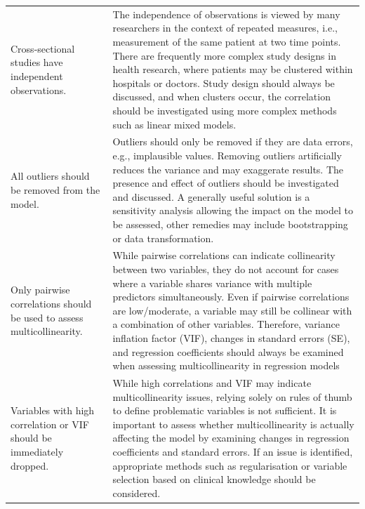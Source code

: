\begin{table}[H]
\begin{widestuff}
\begin{tabular}{p{5cm}p{13cm}}
  Cross-sectional studies have independent observations. & The independence of observations is viewed by many researchers in the context of repeated measures, i.e., measurement of the same patient at two time points.  There are frequently more complex study designs in health research, where patients may be clustered within hospitals or doctors.  Study design should always be discussed, and when clusters occur, the correlation should be investigated using more complex methods such as linear mixed models. \\ 
  All outliers should be removed from the model. & Outliers should only be removed if they are data errors, e.g., implausible values. Removing outliers artificially reduces the variance and may exaggerate results. The presence and effect of outliers should be investigated and discussed. A generally useful solution is a sensitivity analysis allowing the impact on the model to be assessed, other remedies may include bootstrapping or data transformation. \\ 
  Only pairwise correlations should be used to assess multicollinearity. & While pairwise correlations can indicate collinearity between two variables, they do not account for cases where a variable shares variance with multiple predictors simultaneously. Even if pairwise correlations are low/moderate, a variable may still be collinear with a combination of other variables. Therefore, variance inflation factor (VIF), changes in standard errors (SE), and regression coefficients should always be examined when assessing multicollinearity in regression models \\ 
  Variables with high correlation or VIF should be immediately dropped. & While high correlations and VIF may indicate multicollinearity issues, relying solely on rules of thumb to define problematic variables is not sufficient. It is important to assess whether multicollinearity is actually affecting the model by examining changes in regression coefficients and standard errors. If an issue is identified, appropriate methods such as regularisation or variable selection based on clinical knowledge should be considered. \\ 
   \bottomrule
\end{tabular}
\end{widestuff}
\end{table}


